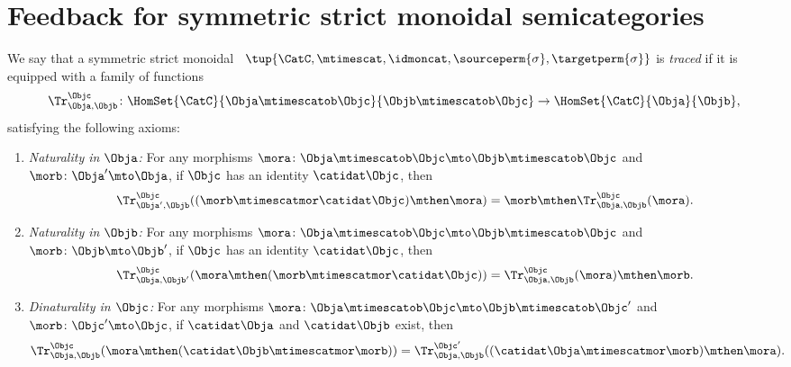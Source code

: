 
\section{Feedback for symmetric strict monoidal semicategories}
\begin{widepar}
    \begin{ctdefinition}
        \label{def:traced-fun-stack-scat}
        We say that a symmetric strict monoidal ~$\tup{\CatC, \mtimescat, \idmoncat, \sourceperm{\sigma}, \targetperm{\sigma} }$ is \emph{traced} if it is equipped with a family of functions
        \begin{equation}
            \Tr_{\Obja,\Objb}^\Objc\colon \HomSet{\CatC}{\Obja \mtimescatob \Objc}{\Objb\mtimescatob \Objc}\to \HomSet{\CatC}{\Obja}{\Objb},
        \end{equation}
        satisfying the following axioms:
        \begin{enumerate}

            \item \emph{Naturality in $\Obja$:} For any morphisms $\mora\colon \Obja\mtimescatob \Objc \mto \Objb\mtimescatob \Objc$ and $\morb \colon \Obja' \mto \Obja$, if $\Objc$ has an identity $\catidat\Objc$, then
                  \begin{equation}
                      \Tr_{\Obja', \Objb}^\Objc ( (\morb \mtimescatmor \catidat\Objc) \mthen \mora) = \morb \mthen \Tr_{\Obja, \Objb}^\Objc (\mora).
                  \end{equation}

            \item \emph{Naturality in $\Objb$:}
                  For any morphisms $\mora\colon \Obja\mtimescatob \Objc \mto \Objb\mtimescatob \Objc$ and $\morb \colon \Objb \mto \Objb'$, if $\Objc$ has an identity $\catidat\Objc$, then
                  \begin{equation}
                      \Tr_{\Obja, \Objb'}^\Objc ( \mora \mthen (\morb \mtimescatmor \catidat\Objc) ) = \Tr_{\Obja, \Objb}^\Objc (\mora) \mthen \morb.
                  \end{equation}

            \item \emph{Dinaturality in $\Objc$:}
                  For any morphisms $\mora \colon \Obja \mtimescatob \Objc \mto \Objb \mtimescatob \Objc'$ and $\morb \colon \Objc' \mto \Objc$, if $\catidat\Obja$ and $\catidat\Objb$ exist, then
                  \begin{equation}
                      \Tr_{\Obja, \Objb}^{\Objc} (\mora \mthen (\catidat\Objb \mtimescatmor \morb)) = \Tr_{\Obja, \Objb}^{\Objc'}((\catidat\Obja \mtimescatmor \morb) \mthen \mora).
                  \end{equation}


\end{enumerate}
\end{ctdefinition}
\end{widepar}
